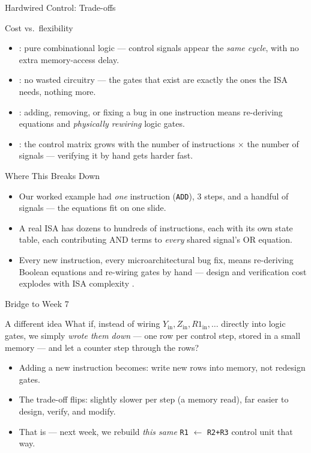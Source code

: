 \documentclass[aspectratio=169]{beamer}
\begin{document}
\begin{frame}{Hardwired Control: Trade-offs}
  \begin{block}{Cost vs.\ flexibility}
    \begin{itemize}
      \item {}: pure combinational logic --- control signals appear the
        \emph{same cycle}, with no extra memory-access delay.
      \item {}: no wasted circuitry --- the gates that exist are exactly
        the ones the ISA needs, nothing more.
      \item {}: adding, removing, or fixing a bug in one instruction means
        re-deriving equations and \emph{physically rewiring} logic gates.
      \item {}: the control matrix grows with the number of instructions
        $\times$ the number of signals --- verifying it by hand gets harder fast.
    \end{itemize}
  \end{block}
\end{frame}

\begin{frame}{Where This Breaks Down}
  \begin{itemize}
    \item Our worked example had \emph{one} instruction (\texttt{ADD}), 3 steps,
      and a handful of signals --- the equations fit on one slide.
    \item A real ISA has dozens to hundreds of instructions, each with its own
      state table, each contributing AND terms to \emph{every} shared signal's OR
      equation.
    \item Every new instruction, every microarchitectural bug fix, means
      re-deriving Boolean equations and re-wiring gates by hand --- design and
      verification cost explodes with ISA complexity \cite{Stallings2015_computer_organization}.
  \end{itemize}
\end{frame}

\begin{frame}{Bridge to Week 7}
  \begin{exampleblock}{A different idea}
    What if, instead of wiring $Y_{\text{in}}, Z_{\text{in}}, R1_{\text{in}}, \dots$ directly
    into logic gates, we simply \emph{wrote them down} --- one row per control
    step, stored in a small memory --- and let a counter step through the rows?
  \end{exampleblock}
  \begin{itemize}
    \item Adding a new instruction becomes: write new rows into memory, not
      redesign gates.
    \item The trade-off flips: slightly slower per step (a memory read), far
      easier to design, verify, and modify.
    \item That is  --- next week, we rebuild
      \emph{this same} \texttt{R1} $\gets$ \texttt{R2+R3} control unit that way.
  \end{itemize}
\end{frame}
\end{document}
